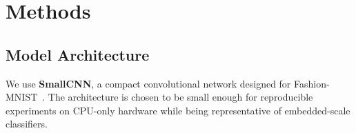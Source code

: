 \section{Methods}
\label{sec:methods}

\subsection{Model Architecture}
\label{sec:model}

We use \textbf{SmallCNN}, a compact convolutional network designed for
Fashion-MNIST~\citep{xiao2017fashion}.
The architecture is chosen to be small enough for reproducible experiments
on CPU-only hardware while being representative of embedded-scale classifiers.

\begin{table}[ht]
\centering
\caption{SmallCNN layer specifications.
$K$: kernel size, $P$: padding, $S$: stride.
Parameter counts include biases.}
\label{tab:arch}
\small
{}
\end{table}

